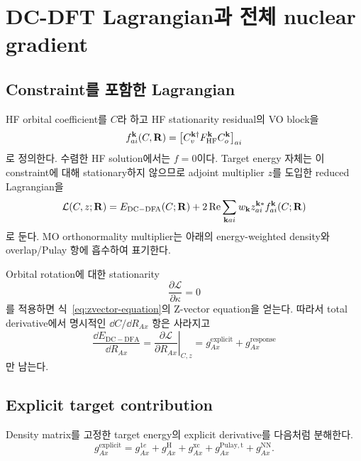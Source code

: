 \section{DC-DFT Lagrangian과 전체 nuclear gradient}
\label{sec:dc-lagrangian}

\subsection{Constraint를 포함한 Lagrangian}

HF orbital coefficient를 $C$라 하고 HF stationarity residual의 VO block을
\begin{equation}
  f_{ai}^{\mathbf{k}}(C,\mathbf{R})
  =\left[C_v^{\mathbf{k}\dagger}F_{\mathrm{HF}}^{\mathbf{k}}C_o^{\mathbf{k}}\right]_{ai}
  \label{eq:hf-stationarity-residual}
\end{equation}
로 정의한다. 수렴한 HF solution에서는 $f=0$이다. Target energy 자체는 이 constraint에
대해 stationary하지 않으므로 adjoint multiplier $z$를 도입한 reduced Lagrangian을
\begin{equation}
  \mathcal L(C,z;\mathbf{R})
  =E_{\mathrm{DC-DFA}}(C;\mathbf{R})
   +2\operatorname{Re}\sum_{\mathbf{k} ai}w_{\mathbf{k}}
    z_{ai}^{\mathbf{k} *}f_{ai}^{\mathbf{k}}(C;\mathbf{R})
  \label{eq:dc-lagrangian}
\end{equation}
로 둔다. MO orthonormality multiplier는 아래의 energy-weighted density와 overlap/Pulay
항에 흡수하여 표기한다.

Orbital rotation에 대한 stationarity
\begin{equation}
  \frac{\partial\mathcal L}{\partial\kappa}=0
  \label{eq:lagrangian-orbital-stationarity}
\end{equation}
를 적용하면 식~\eqref{eq:zvector-equation}의 Z-vector equation을 얻는다. 따라서 total
derivative에서 명시적인 $\dd C/\dd R_{Ax}$ 항은 사라지고
\begin{equation}
  \frac{\dd E_{\mathrm{DC-DFA}}}{\dd R_{Ax}}
  =\left.\frac{\partial\mathcal L}{\partial R_{Ax}}\right|_{C,z}
  =g_{Ax}^{\mathrm{explicit}}+g_{Ax}^{\mathrm{response}}
  \label{eq:dc-gradient-master}
\end{equation}
만 남는다.

\subsection{Explicit target contribution}

Density matrix를 고정한 target energy의 explicit derivative를 다음처럼 분해한다.
\begin{equation}
  g_{Ax}^{\mathrm{explicit}}
  =g_{Ax}^{1e}+g_{Ax}^{\mathrm H}+g_{Ax}^{\mathrm{xc}}
   +g_{Ax}^{\mathrm{Pulay,t}}+g_{Ax}^{\mathrm{NN}}.
  \label{eq:explicit-gradient-decomposition}
\end{equation}

